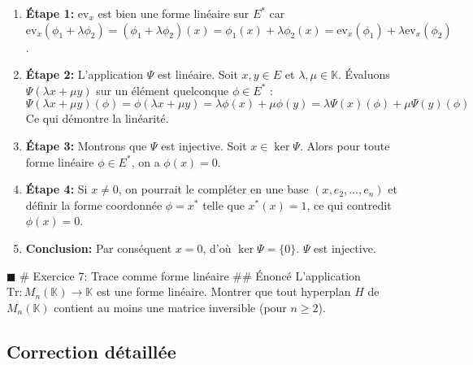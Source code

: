 \begin{enumerate}
\def\labelenumi{\arabic{enumi}.}
\tightlist
\item
  \textbf{Étape 1:} \(\text{ev}_x\) est bien une forme linéaire sur
  \(E^*\) car
  \(\text{ev}_x(\phi_1 + \lambda \phi_2) = (\phi_1 + \lambda \phi_2)(x) = \phi_1(x) + \lambda \phi_2(x) = \text{ev}_x(\phi_1) + \lambda \text{ev}_x(\phi_2)\).
\item
  \textbf{Étape 2:} L'application \(\Psi\) est linéaire. Soit
  \(x, y \in E\) et \(\lambda, \mu \in \mathbb{K}\). Évaluons
  \(\Psi(\lambda x + \mu y)\) sur un élément quelconque \(\phi \in E^*\)
  :
  \[\Psi(\lambda x + \mu y)(\phi) = \phi(\lambda x + \mu y) = \lambda \phi(x) + \mu \phi(y) = \lambda \Psi(x)(\phi) + \mu \Psi(y)(\phi)\]
  Ce qui démontre la linéarité.
\item
  \textbf{Étape 3:} Montrons que \(\Psi\) est injective. Soit
  \(x \in \ker \Psi\). Alors pour toute forme linéaire \(\phi \in E^*\),
  on a \(\phi(x) = 0\).
\item
  \textbf{Étape 4:} Si \(x \neq 0\), on pourrait le compléter en une
  base \((x, e_2, \dots, e_n)\) et définir la forme coordonnée
  \(\phi=x^*\) telle que \(x^*(x)=1\), ce qui contredit \(\phi(x)=0\).
\item
  \textbf{Conclusion:} Par conséquent \(x=0\), d'où
  \(\ker \Psi = \{0\}\). \(\Psi\) est injective.
\end{enumerate}

\(\blacksquare\) \# Exercice 7: Trace comme forme linéaire \#\# Énoncé
L'application \(\text{Tr} : M_n(\mathbb{K}) \to \mathbb{K}\) est une
forme linéaire. Montrer que tout hyperplan \(H\) de \(M_n(\mathbb{K})\)
contient au moins une matrice inversible (pour \(n \ge 2\)).

\hypertarget{correction-duxe9tailluxe9e-6}{%
\subsection{Correction détaillée}\label{correction-duxe9tailluxe9e-6}}

